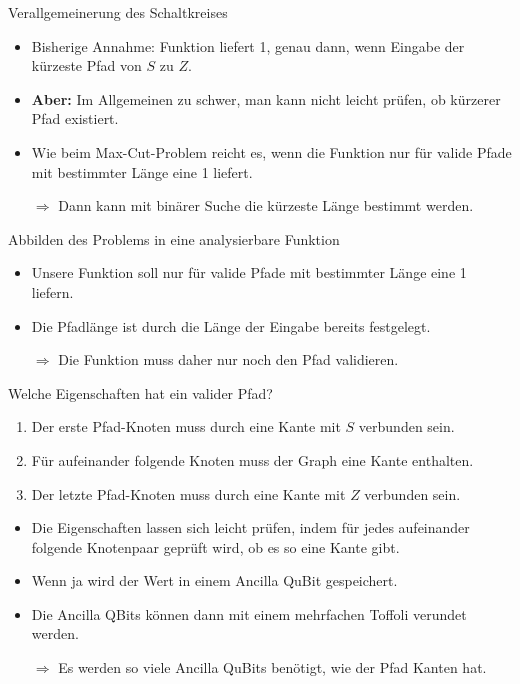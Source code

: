 \documentclass[fleqn,compress,utf8,aspectratio=169,t]{beamer}
\begin{document}
\begin{frame}{Verallgemeinerung des Schaltkreises}
\begin{itemize}
	\item Bisherige Annahme: Funktion liefert 1, genau dann, wenn Eingabe der kürzeste Pfad von $S$ zu $Z$.
	\item \textbf{Aber:} Im Allgemeinen zu schwer, man kann nicht leicht prüfen, ob kürzerer Pfad existiert.
	\item Wie beim Max-Cut-Problem reicht es, wenn die Funktion nur für valide Pfade mit bestimmter Länge eine 1 liefert.
	\item[$\Rightarrow$] Dann kann mit binärer Suche die kürzeste Länge bestimmt werden.
\end{itemize}
\end{frame}

\begin{frame}{Abbilden des Problems in eine analysierbare Funktion}
\begin{itemize}
	\item Unsere Funktion soll nur für valide Pfade mit bestimmter Länge eine 1 liefern.
	\item Die Pfadlänge ist durch die Länge der Eingabe bereits festgelegt.
	\item[$\Rightarrow$] Die Funktion muss daher nur noch den Pfad validieren.
\end{itemize}
\end{frame}

\begin{frame}{Welche Eigenschaften hat ein valider Pfad?}
\begin{enumerate}
	\item Der erste Pfad-Knoten muss durch eine Kante mit $S$ verbunden sein.
	\item Für aufeinander folgende Knoten muss der Graph eine Kante enthalten.
	\item Der letzte Pfad-Knoten muss durch eine Kante mit $Z$ verbunden sein.
\end{enumerate}
\begin{itemize}
	\item Die Eigenschaften lassen sich leicht prüfen, indem für jedes aufeinander folgende Knotenpaar geprüft wird, ob es so eine Kante gibt.
	\item Wenn ja wird der Wert in einem Ancilla QuBit gespeichert.
	\item Die Ancilla QBits können dann mit einem mehrfachen Toffoli verundet werden.
	\item[$\Rightarrow$] Es werden so viele Ancilla QuBits benötigt, wie der Pfad Kanten hat.
\end{itemize}

\end{frame}
\end{document}
